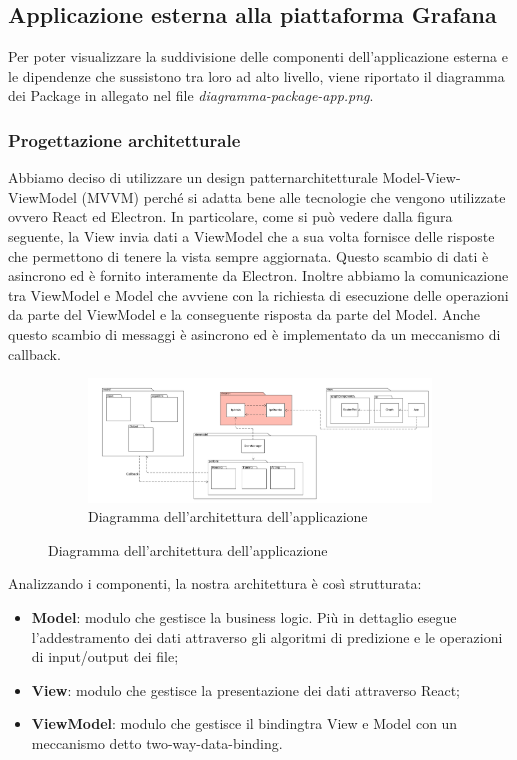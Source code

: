 \subsection{Applicazione esterna alla piattaforma Grafana}
Per poter visualizzare la suddivisione delle componenti dell'applicazione esterna e le dipendenze che sussistono tra loro ad alto livello, viene riportato il diagramma dei Package in allegato nel file \textit{diagramma-package-app.png}.
	\subsubsection{Progettazione architetturale}
	Abbiamo deciso di utilizzare un design pattern\glosp architetturale Model-View-ViewModel (MVVM) perché si adatta bene alle tecnologie che vengono utilizzate ovvero React ed Electron. In particolare, come si può vedere dalla figura seguente, la View invia dati a ViewModel che a sua volta fornisce delle risposte che permettono di tenere la vista sempre aggiornata. Questo scambio di dati è asincrono ed è fornito interamente da Electron. Inoltre abbiamo la comunicazione tra ViewModel e Model che avviene con la richiesta di esecuzione delle operazioni da parte del ViewModel e la conseguente risposta da parte del Model. Anche questo scambio di messaggi è asincrono ed è implementato da un meccanismo di callback\glo.
	\mbox{}
	\begin{landscape}
		\begin{figure}
			\begin{figure} [H]
				\includegraphics[width=\linewidth]{./img/Diagrammi/architettura-app.png}
				\caption{Diagramma dell'architettura dell'applicazione}
			\end{figure}
		\end{figure}
	\end{landscape}
	Analizzando i componenti, la nostra architettura è così strutturata: 
	\begin{itemize}
		\item \textbf{Model}: modulo che gestisce la business logic\glo. Più in dettaglio esegue l'addestramento dei dati attraverso gli algoritmi di predizione e le operazioni di input/output dei file;
		\item \textbf{View}: modulo che gestisce la presentazione dei dati attraverso React;
		\item \textbf{ViewModel}: modulo che gestisce il binding\glosp tra View e Model con un meccanismo detto two-way-data-binding.
	\end{itemize}
